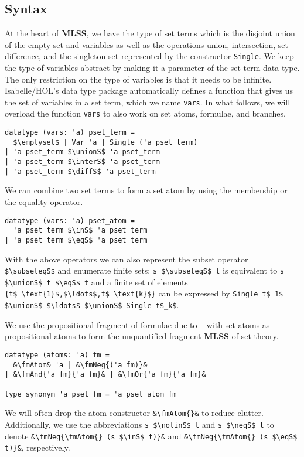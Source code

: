 \documentclass[sigplan,10pt,anonymous,review]{acmart}
\newcommand{\MLSS}{\textbf{MLSS}}
\newcommand{\unionS}{\sqcup_\text{s}}
\newcommand{\interS}{\sqcap_\text{s}}
\newcommand{\diffS}{-_\text{s}}
\newcommand{\inS}{\in_\text{s}}
\newcommand{\notinS}{\notin_\text{s}}
\newcommand{\eqS}{=_\text{s}}
\newcommand{\neqS}{\neq_\text{s}}
\newcommand{\subseteqS}{\sqsubseteq_\text{s}}
\newcommand{\fmAnd}[2]{#1 $\boldsymbol{\land}$ #2}
\newcommand{\fmOr}[2]{#1 $\boldsymbol{\lor}$ #2}
\newcommand{\fmNegSymbol}{\boldsymbol{\neg}}
\newcommand{\fmNeg}[1]{$\fmNegSymbol$ #1}
\newcommand{\fmAtom}{\textbf{A}}
\begin{document}
\subsection{Syntax}
At the heart of \MLSS{}, we have the type of set terms which is the disjoint union of the empty set and variables as well as the operations union, intersection, set difference, and the singleton set represented by the constructor \lstinline!Single!.
We keep the type of variables abstract by making it a parameter of the set term data type.
The only restriction on the type of variables is that it needs to be infinite.
Isabelle/HOL's data type package automatically defines a function that gives us the set of variables in a set term, which we name \lstinline!vars!.
In what follows, we will overload the function \lstinline!vars! to also work on set atoms, formulae, and branches.
\begin{lstlisting}
datatype (vars: 'a) pset_term =
  $\emptyset$ | Var 'a | Single ('a pset_term)
| 'a pset_term $\unionS$ 'a pset_term
| 'a pset_term $\interS$ 'a pset_term
| 'a pset_term $\diffS$ 'a pset_term
\end{lstlisting}
We can combine two set terms to form a set atom by using the membership or the equality operator.
\begin{lstlisting}
datatype (vars: 'a) pset_atom =
  'a pset_term $\inS$ 'a pset_term
| 'a pset_term $\eqS$ 'a pset_term
\end{lstlisting}
With the above operators we can also represent the subset operator \lstinline!$\subseteqS$! and enumerate finite sets: \lstinline!s $\subseteqS$ t! is equivalent to \lstinline!s $\unionS$ t $\eqS$ t! and a finite set of elements \lstinline!{t$_\text{1}$,$\ldots$,t$_\text{k}$}! can be expressed by \lstinline!Single t$_1$ $\unionS$ $\ldots$ $\unionS$ Single t$_k$!.

We use the propositional fragment of formulae due to \citeauthor{lqe}~\cite{lqe} with set atoms as propositional atoms to form the unquantified fragment \MLSS{} of set theory.
\begin{lstlisting}
datatype (atoms: 'a) fm =
  &\fmAtom& 'a | &\fmNeg{('a fm)}&
| &\fmAnd{'a fm}{'a fm}& | &\fmOr{'a fm}{'a fm}&

type_synonym 'a pset_fm = 'a pset_atom fm
\end{lstlisting}
We will often drop the atom constructor \lstinline!&\fmAtom{}&! to reduce clutter.
Additionally, we use the abbreviations \lstinline!s $\notinS$ t! and \lstinline!s $\neqS$ t! to denote \lstinline!&\fmNeg{\fmAtom{} (s $\inS$ t)}&! and \lstinline!&\fmNeg{\fmAtom{} (s $\eqS$ t)}&!, respectively.
\end{document}
